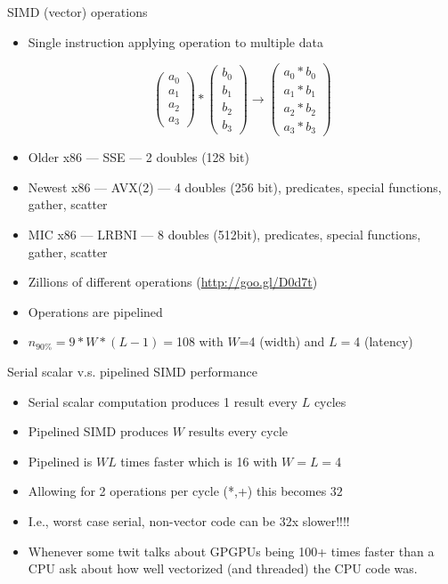 \begin{frame}{SIMD (vector) operations}
  \begin{itemize}
  \item Single instruction applying operation to multiple data

\[
  \begin{pmatrix}a_0\\a_1\\a_2\\a_3\end{pmatrix}
  *
  \begin{pmatrix}b_0\\b_1\\b_2\\b_3\end{pmatrix}
  \rightarrow 
  \begin{pmatrix}a_0 * b_0\\a_1*b_1\\a_2*b_2\\a_3*b_3\end{pmatrix}
\]

  \item Older x86 --- SSE --- 2 doubles (128 bit)
  \item Newest x86 --- AVX(2) --- 4 doubles (256 bit), predicates, special functions, gather, scatter
  \item MIC x86 --- LRBNI --- 8 doubles (512bit), predicates, special functions, gather, scatter
  \item Zillions of different operations (\url{http://goo.gl/D0d7t})
  \\
  \item Operations are pipelined 

  \item $n_{90\%} = 9*W*(L-1) =$108 with $W$=4 (width) and $L=$4 (latency)

  \end{itemize}
  
\end{frame}

\begin{frame}{Serial scalar v.s. pipelined SIMD performance}

  \begin{itemize}
  \item Serial scalar computation produces 1 result every $L$ cycles
  \item Pipelined SIMD produces $W$ results every cycle
  \item Pipelined is $W L$ times faster which is 16 with $W=L=$4
  \item Allowing for 2 operations per cycle (*,+) this becomes $32$
  \item I.e., worst case serial, non-vector code can be 32x slower!!!!
  \\  
  
  \item Whenever some twit talks about GPGPUs being 100+ times faster
    than a CPU ask about how well vectorized (and threaded) the CPU
    code was.

  \end{itemize}

\end{frame}

